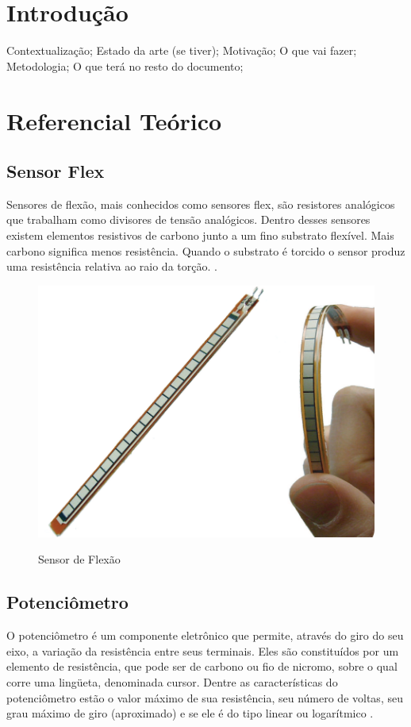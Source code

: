 \documentclass[
	12pt,				%
	openright,			%
	oneside,			%
	a4paper,			%
	english,			%
	brazil				%
	]{abntex2}
\begin{document}
\chapter{Introdução} %
		
		Contextualização; Estado da arte (se tiver); Motivação; O que vai fazer; Metodologia; O que terá no resto do documento;


	
	\chapter{Referencial Teórico}

		\section{Sensor Flex}
		Sensores de flexão, mais conhecidos como sensores flex, são resistores analógicos que trabalham como divisores de tensão analógicos. Dentro desses sensores existem elementos resistivos de carbono junto a um fino substrato flexível. Mais carbono significa menos resistência. Quando o substrato é torcido o sensor produz uma resistência relativa ao raio da torção. \cite{solanki2013sign}.

	\begin{figure}[!h]
		\centering
		\caption{Sensor de Flexão}
		\includegraphics[width=12cm,keepaspectratio=true]{./figures/flex-sensor1.png}
		\label{Fig:flex-sensor1}
	\end{figure}

		\section{Potenciômetro}
		O potenciômetro é um componente eletrônico que permite, através do giro do seu eixo, a variação da resistência entre seus terminais. Eles são constituídos por um elemento de resistência, que pode ser de carbono ou fio de nicromo, sobre o qual corre uma lingüeta, denominada cursor. Dentre as características do potenciômetro estão o valor máximo de sua resistência, seu número de voltas, seu grau máximo de giro (aproximado) e se ele é do tipo linear ou logarítmico \cite{ncb2012eletronicabasica}.
\end{document}
